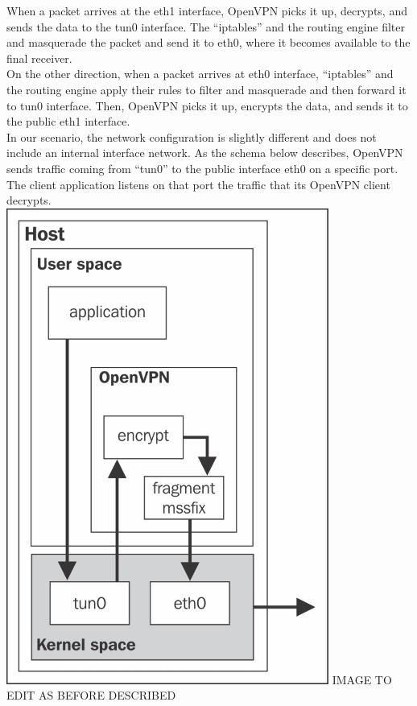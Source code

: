 \documentclass[]{article}
\begin{document}
	When a packet arrives at the eth1 interface, OpenVPN picks it up, decrypts, and sends the data to the tun0 interface. The ``iptables'' and the routing engine filter and masquerade the packet and send it to eth0, where it becomes available to the final receiver.\\On the other direction, when a packet arrives at eth0 interface, ``iptables'' and the routing engine apply their rules to filter and masquerade and then forward it to tun0 interface. Then, OpenVPN picks it up, encrypts the data, and sends it to the public eth1 interface.\\
	In our scenario, the network configuration is slightly different and does not include an internal interface network. As the schema below describes, OpenVPN sends traffic coming from ``tun0'' to the public interface eth0 on a specific port. The client application listens on that port the traffic that its OpenVPN client decrypts. \\

	\includegraphics{"images/openvpn_tun_interface.jpg"}
	IMAGE TO EDIT AS BEFORE DESCRIBED\\
\end{document}

